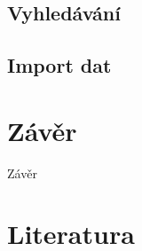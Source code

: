 \documentclass[11pt,oneside]{fithesis2}
\begin{document}
\section{Vyhledávání}

\section{Import dat}

\chapter{Závěr}
Závěr



\printindex

\begingroup
\def\tmpchapter{0}
\renewcommand{\chaptername}{}
\renewcommand{\thechapter}{}
\chapter{Literatura}
\renewcommand{\chapter}[2]{}%
\end{document}
